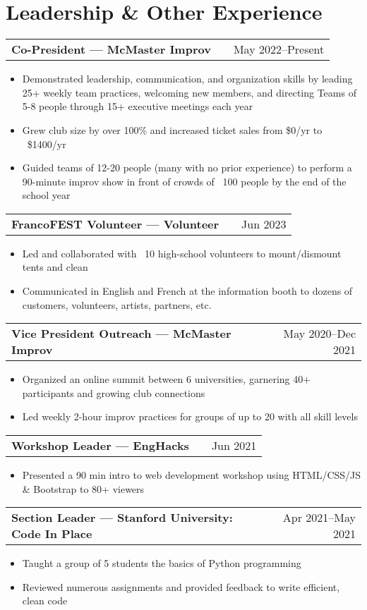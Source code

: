 \documentclass[a4paper,12pt]{article}
\makeatletter
\newenvironment{joblong}[2]
    {
    \begin{tabularx}{\linewidth}{@{}l X r@{}}
    \textbf{#1} & \hfill &  #2 \\[3.75pt]
    \end{tabularx}
    \begin{minipage}[t]{\linewidth}
    \begin{itemize}[nosep,after=\strut, leftmargin=1em, itemsep=3pt,label=--]
    }
    {
    \end{itemize}
    \end{minipage}    
    }
\makeatother
\begin{document}
\section{Leadership \& Other Experience}

\begin{joblong}{Co-President — McMaster Improv}{May 2022--Present}
\item Demonstrated leadership, communication, and organization skills by leading 25+ weekly team practices, welcoming new members, and directing Teams of 5-8 people through 15+ executive meetings each year
\item Grew club size by over 100\% and increased ticket sales from \$0/yr to ~\$1400/yr
\item Guided teams of 12-20 people (many with no prior experience) to perform a 90-minute improv show in front of crowds of ~100 people by the end of the school year
\end{joblong}

\begin{joblong}{FrancoFEST Volunteer — Volunteer}{Jun 2023}
\item Led and collaborated with ~10 high-school volunteers to mount/dismount tents and clean
\item Communicated in English and French at the information booth to dozens of customers, volunteers, artists, partners, etc.
\end{joblong}

\begin{joblong}{Vice President Outreach — McMaster Improv}{May 2020--Dec 2021}
\item Organized an online summit between 6 universities, garnering 40+ participants and growing club connections
\item Led weekly 2-hour improv practices for groups of up to 20 with all skill levels
\end{joblong}

\begin{joblong}{Workshop Leader — EngHacks}{Jun 2021}
\item Presented a 90 min intro to web development workshop using HTML/CSS/JS \& Bootstrap to 80+ viewers
\end{joblong}

\begin{joblong}{Section Leader — Stanford University: Code In Place}{Apr 2021--May 2021}
\item Taught a group of 5 students the basics of Python programming
\item Reviewed numerous assignments and provided feedback to write efficient, clean code
\end{joblong}
\end{document}
